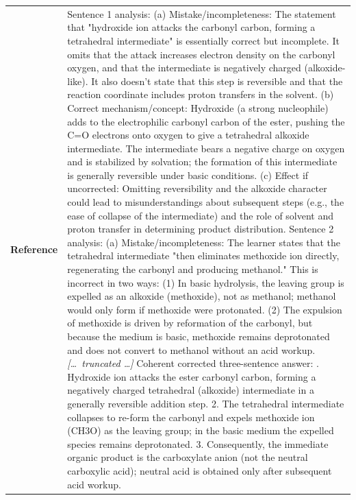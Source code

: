 \begin{longtable}{@{}l p{12.5cm}@{}}
  \textbf{Reference} & Sentence 1 analysis: \newline (a) Mistake/incompleteness: The statement that "hydroxide ion attacks the carbonyl carbon, forming a tetrahedral intermediate" is essentially correct but incomplete. It omits that the attack increases electron density on the carbonyl oxygen, and that the intermediate is negatively charged (alkoxide-like). It also doesn't state that this step is reversible and that the reaction coordinate includes proton transfers in the solvent. \newline (b) Correct mechanism/concept: Hydroxide (a strong nucleophile) adds to the electrophilic carbonyl carbon of the ester, pushing the C=O electrons onto oxygen to give a tetrahedral alkoxide intermediate. The intermediate bears a negative charge on oxygen and is stabilized by solvation; the formation of this intermediate is generally reversible under basic conditions. \newline (c) Effect if uncorrected: Omitting reversibility and the alkoxide character could lead to misunderstandings about subsequent steps (e.g., the ease of collapse of the intermediate) and the role of solvent and proton transfer in determining product distribution. \newline Sentence 2 analysis: \newline (a) Mistake/incompleteness: The learner states that the tetrahedral intermediate "then eliminates methoxide ion directly, regenerating the carbonyl and producing methanol." This is incorrect in two ways: (1) In basic hydrolysis, the leaving group is expelled as an alkoxide (methoxide), not as methanol; methanol would only form if methoxide were protonated. (2) The expulsion of methoxide is driven by reformation of the carbonyl, but because the medium is basic, methoxide remains deprotonated and does not convert to methanol without an acid workup. \newline \textit{[\ldots\ truncated \ldots]} \newline Coherent corrected three-sentence answer: \newline 1. Hydroxide ion attacks the ester carbonyl carbon, forming a negatively charged tetrahedral (alkoxide) intermediate in a generally reversible addition step. 2. The tetrahedral intermediate collapses to re-form the carbonyl and expels methoxide ion (CH3O) as the leaving group; in the basic medium the expelled species remains deprotonated. 3. Consequently, the immediate organic product is the carboxylate anion (not the neutral carboxylic acid); neutral acid is obtained only after subsequent acid workup. \\

\end{longtable}

